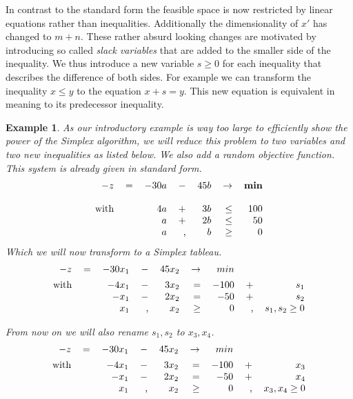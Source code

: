 \documentclass[a4paper, 11pt]{article}
\newtheorem{example}{Example}
\begin{document}
In contrast to the standard form the feasible space is now restricted by linear equations rather than inequalities. Additionally the dimensionality of $x'$ has changed to $m+n$. These rather absurd looking changes are motivated by introducing so called \textit{slack variables} that are added to the smaller side of the inequality. We thus introduce a new variable $s\geq 0$ for each inequality that describes the difference of both sides. For example we can transform the inequality $x\leq y$ to the equation $x + s=y$. This new equation is equivalent in meaning to its predecessor inequality.\\

\begin{example}
	As our introductory example is way too large to efficiently show the power of the Simplex algorithm, we will reduce this problem to two variables and two new inequalities as listed below. We also add a random objective function. This system is already given in standard form.\\
	
	\begin{equation}
		\begin{tabular}{rrrrrrr}
			$ -z $&$=$& $-30a$ &$- $&$45b$ &$\rightarrow$& $\textbf{min}$ \\
			\\
			with&&$4a$ &$+$&$3b$&$\leq$&$100$\\
			&&$a$ & $+$&$2b$&$\leq$&$50$\\
			&&$a$ & ,&$b$ &$\geq$&$0$
		\end{tabular}
	\end{equation}
	Which we will now transform to a Simplex tableau.
	\begin{equation}
		\begin{tabular}{rrrrrrrrr}
			$ -z $&$=$& $-30x_1$ &$-$&$45x_2$ &$\rightarrow$& \textbf{$min$}&& \vspace{0.15cm}\\
			with &&$-4x_1$ &$-$&$3x_2$&$=$&$-100$&$+$&$s_1$\\
			&&$-x_1$ & $-$&$2x_2$&$=$&$-50$&$+$&$s_2$\\
			&&$x_1$ &, &$x_2$&$\geq$&$0$ &,&$s_1, s_2 \geq 0$
		\end{tabular}
	\end{equation}

	From now on we will also rename $s_1,s_2$ to $x_3, x_4$.
	\begin{equation}
		\begin{tabular}{rrrrrrrrr}
			$ -z $&$=$& $-30x_1$ &$-$&$45x_2$ &$\rightarrow$& \textbf{$min$}&& \vspace{0.15cm}\\
			with &&$-4x_1$ &$-$&$3x_2$&$=$&$-100$&$+$&$x_3$\\
			&&$-x_1$ & $-$&$2x_2$&$=$&$-50$&$+$&$x_4$\\
			&&$x_1$ &, &$x_2$&$\geq$&$0$ &,&$x_3, x_4 \geq 0$
		\end{tabular}
	\end{equation}
\end{example}
\end{document}
